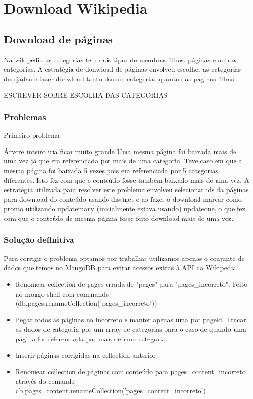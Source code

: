 \section{Download Wikipedia}

\subsection{Download de páginas}

Na wikipedia as categorias tem dois tipos de membros filhos: páginas e outras categorias.
A estratégia de donwload de páginas envolveu escolher as categorias desejadas e fazer donwload tanto das subcategorias quanto das páginas filhas.

ESCREVER SOBRE ESCOLHA DAS CATEGORIAS

\subsubsection{Problemas}

Primeiro problema

Árvore inteiro iria ficar muito grande
Uma mesma página foi baixada mais de uma vez já que era referenciada por mais de uma categoria. Teve caso em que a mesma página foi baixada 5 vezes pois era 
referenciada por 5 categorias diferentes. Isto fez com que o conteúdo fosse também baixado mais de uma vez. A estratégia utilizada para resolver este problema 
envolveu selecionar ids da páginas para download do conteúdo usando distinct e ao fazer o download marcar como pronto utilizando updatemany (inicialmente estava 
usando) updateone, o que fez com que o conteúdo da mesma página fosse feito download mais de uma vez.

\subsubsection{Solução definitiva}

Para corrigir o problema optamos por trabalhar utilizamos apenas o conjunto de dados que temos no MongoDB para evitar acessos extras à API da Wikipedia.

\begin{itemize}
    \item Renomear collection de pages errada de "pages" para "pages\_incorreto". Feito no mongo shell com commando (db.pages.renameCollection('pages\_incorreto'))
    \item Pegar todos as páginas no incorreto e manter apenas uma por pageid. Trocar os dados de categoria por um array de categorias para o caso de quando uma 
    página for referenciada por mais de uma categoria. 
    \item Inserir páginas corrigidas na collection anterior
    \item Renomear collection de páginas com conteúdo para pages\_content\_incorreto através do comando 
    db.pages\_content.renameCollection('pages\_content\_incorreto')

\end{itemize}